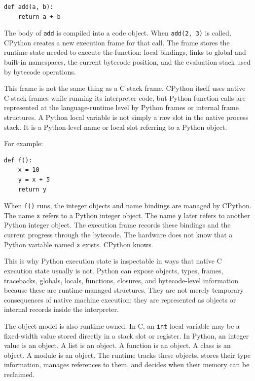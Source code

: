 \begin{verbatim}
def add(a, b):
    return a + b
\end{verbatim}

The body of \texttt{add} is compiled into a code object. When \texttt{add(2, 3)} is called, CPython creates a new execution frame for that call. The frame stores the runtime state needed to execute the function: local bindings, links to global and built-in namespaces, the current bytecode position, and the evaluation stack used by bytecode operations.

This frame is not the same thing as a C stack frame. CPython itself uses native C stack frames while running its interpreter code, but Python function calls are represented at the language-runtime level by Python frames or internal frame structures. A Python local variable is not simply a raw slot in the native process stack. It is a Python-level name or local slot referring to a Python object.

For example:

\begin{verbatim}
def f():
    x = 10
    y = x + 5
    return y
\end{verbatim}

When \texttt{f()} runs, the integer objects and name bindings are managed by CPython. The name \texttt{x} refers to a Python integer object. The name \texttt{y} later refers to another Python integer object. The execution frame records these bindings and the current progress through the bytecode. The hardware does not know that a Python variable named \texttt{x} exists. CPython knows.

This is why Python execution state is inspectable in ways that native C execution state usually is not. Python can expose objects, types, frames, tracebacks, globals, locals, functions, closures, and bytecode-level information because these are runtime-managed structures. They are not merely temporary consequences of native machine execution; they are represented as objects or internal records inside the interpreter.

The object model is also runtime-owned. In C, an \texttt{int} local variable may be a fixed-width value stored directly in a stack slot or register. In Python, an integer value is an object. A list is an object. A function is an object. A class is an object. A module is an object. The runtime tracks these objects, stores their type information, manages references to them, and decides when their memory can be reclaimed.

